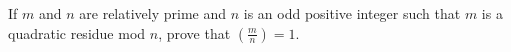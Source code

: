 If $m$ and $n$ are relatively prime and $n$ is an odd positive integer such that $m$ is a quadratic residue mod $n$, prove that $\left(\frac{m}{n}\right)=1$.